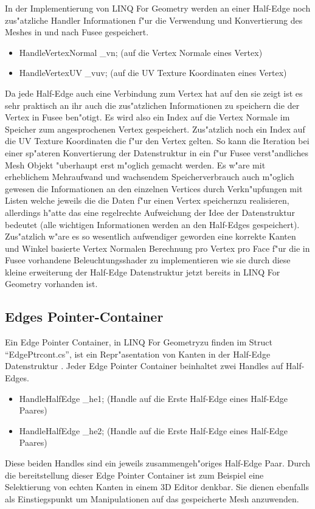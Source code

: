 \documentclass[pagesize, paper=a4, fontsize=12pt,titlepage=true, headings=small, headnosepline, abstractoff, liststotoc, nochapterprefix, plainheadsepline]{scrreprt}
\newcommand{\LFG}{LINQ For Geometry}
\newcommand{\LFGS}{LINQ For Geometry }
\newcommand{\HES}{Half-Edge Datenstruktur }
\begin{document}
In der Implementierung von \LFGS werden an einer Half-Edge noch zus"atzliche Handler Informationen f"ur die Verwendung und Konvertierung des Meshes in und nach Fusee gespeichert.

\begin{itemize}
\item HandleVertexNormal \_vn; (auf die Vertex Normale eines Vertex)
\item HandleVertexUV \_vuv; (auf die UV Texture Koordinaten eines Vertex)
\end{itemize}

Da jede Half-Edge auch eine Verbindung zum Vertex hat auf den sie zeigt ist es sehr praktisch an ihr auch die zus"atzlichen Informationen zu speichern die der Vertex in Fusee ben"otigt. Es wird also ein Index auf die Vertex Normale im Speicher zum angesprochenen Vertex gespeichert. Zus"atzlich noch ein Index auf die UV Texture Koordinaten die f"ur den Vertex gelten. So kann die Iteration bei einer sp"ateren Konvertierung der Datenstruktur in ein f"ur Fusee verst"andliches Mesh Objekt "uberhaupt erst m"oglich gemacht werden. Es w"are mit erheblichem Mehraufwand und wachsendem Speicherverbrauch auch m"oglich gewesen die Informationen an den einzelnen Vertices durch Verkn"upfungen mit Listen welche jeweils die die Daten f"ur einen Vertex speichernzu realisieren, allerdings h"atte das eine regelrechte Aufweichung der Idee der Datenstruktur bedeutet (alle wichtigen Informationen werden an den Half-Edges gespeichert). Zus"atzlich w"are es so wesentlich aufwendiger geworden eine korrekte Kanten und Winkel basierte Vertex Normalen Berechnung pro Vertex pro Face f"ur die in Fusee vorhandene Beleuchtungsshader zu implementieren wie sie durch diese kleine erweiterung der \HES jetzt bereits in \LFGS vorhanden ist.
		\subsection {Edges Pointer-Container}
			Ein Edge Pointer Container, in \LFG zu finden im Struct "`EdgePtrcont.cs"', ist ein Repr"asentation von Kanten in der \HES. Jeder Edge Pointer Container beinhaltet zwei Handles auf Half-Edges.
\begin{itemize}
\item HandleHalfEdge \_he1; (Handle auf die Erste Half-Edge eines Half-Edge Paares)
\item HandleHalfEdge \_he2; (Handle auf die Erste Half-Edge eines Half-Edge Paares)
\end{itemize}
Diese beiden Handles sind ein jeweils zusammengeh"origes Half-Edge Paar. Durch die bereitstellung dieser Edge Pointer Container ist zum Beispiel eine Selektierung von echten Kanten in einem 3D Editor denkbar. Sie dienen ebenfalls als Einstiegspunkt um Manipulationen auf das gespeicherte Mesh anzuwenden.
\end{document}
